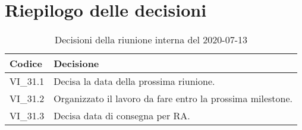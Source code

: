 \section{Riepilogo delle decisioni}
\begin{longtable}{ 
	 >{\centering}p{} >{}p{} }
	
	\caption{Decisioni della riunione interna del 2020-07-13}\\	
	
	\textbf{\color{white}Codice} & 
	\textbf{\color{white}Decisione} 
	\tabularnewline  
	\endhead
	
	VI\_31.1 & Decisa la data della prossima riunione. \\
	VI\_31.2 & Organizzato il lavoro da fare entro la prossima milestone\textit{\ped{G}}. \\
	VI\_31.3 & Decisa data di consegna per RA. \\
\end{longtable}
